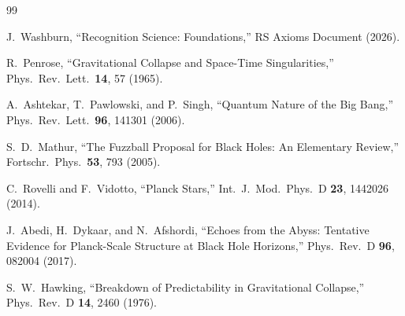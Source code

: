 \documentclass[12pt,a4paper]{article}
\theoremstyle{definition}
\theoremstyle{remark}
\begin{document}
\begin{thebibliography}{99}

J.~Washburn, ``Recognition Science: Foundations,''
RS Axioms Document (2026).

R.~Penrose, ``Gravitational Collapse and Space-Time Singularities,''
Phys.\ Rev.\ Lett.\ \textbf{14}, 57 (1965).

A.~Ashtekar, T.~Pawlowski, and P.~Singh, ``Quantum Nature of the
Big Bang,'' Phys.\ Rev.\ Lett.\ \textbf{96}, 141301 (2006).

S.~D.~Mathur, ``The Fuzzball Proposal for Black Holes: An Elementary
Review,'' Fortschr.\ Phys.\ \textbf{53}, 793 (2005).

C.~Rovelli and F.~Vidotto, ``Planck Stars,'' Int.\ J.\ Mod.\ Phys.\
D \textbf{23}, 1442026 (2014).

J.~Abedi, H.~Dykaar, and N.~Afshordi, ``Echoes from the Abyss:
Tentative Evidence for Planck-Scale Structure at Black Hole
Horizons,'' Phys.\ Rev.\ D \textbf{96}, 082004 (2017).

S.~W.~Hawking, ``Breakdown of Predictability in Gravitational
Collapse,'' Phys.\ Rev.\ D \textbf{14}, 2460 (1976).

\end{thebibliography}
\end{document}
